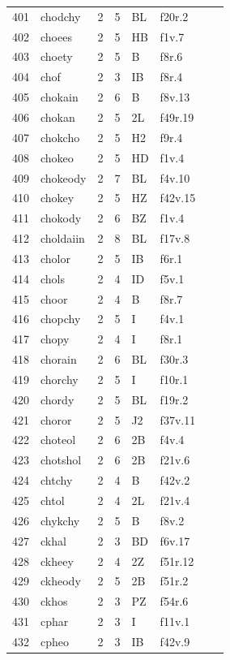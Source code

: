 \documentclass[11pt,a4paper]{article}
\begin{document}
\begin{landscape}
\begin{longtable}{@{}r>{\ttfamily}lrrl>{\ttfamily}l>{\raggedright\arraybackslash}p{80mm}>{\raggedright\arraybackslash}p{36mm}@{}}
401 & chodchy & 2 & 5 & BL & f20r.2 &  & \\
402 & choees & 2 & 5 & HB & f1v.7 &  & \\
403 & choety & 2 & 5 & B & f8r.6 &  & \\
404 & chof & 2 & 3 & IB & f8r.4 &  & \\
405 & chokain & 2 & 6 & B & f8v.13 &  & \\
406 & chokan & 2 & 5 & 2L & f49r.19 &  & \\
407 & chokcho & 2 & 5 & H2 & f9r.4 &  & \\
408 & chokeo & 2 & 5 & HD & f1v.4 &  & \\
409 & chokeody & 2 & 7 & BL & f4v.10 &  & \\
410 & chokey & 2 & 5 & HZ & f42v.15 &  & \\
411 & chokody & 2 & 6 & BZ & f1v.4 &  & \\
412 & choldaiin & 2 & 8 & BL & f17v.8 &  & \\
413 & cholor & 2 & 5 & IB & f6r.1 &  & \\
414 & chols & 2 & 4 & ID & f5v.1 &  & \\
415 & choor & 2 & 4 & B & f8r.7 &  & \\
416 & chopchy & 2 & 5 & I & f4v.1 &  & \\
417 & chopy & 2 & 4 & I & f8r.1 &  & \\
418 & chorain & 2 & 6 & BL & f30r.3 &  & \\
419 & chorchy & 2 & 5 & I & f10r.1 &  & \\
420 & chordy & 2 & 5 & BL & f19r.2 &  & \\
421 & choror & 2 & 5 & J2 & f37v.11 &  & \\
422 & choteol & 2 & 6 & 2B & f4v.4 &  & \\
423 & chotshol & 2 & 6 & 2B & f21v.6 &  & \\
424 & chtchy & 2 & 4 & B & f42v.2 &  & \\
425 & chtol & 2 & 4 & 2L & f21v.4 &  & \\
426 & chykchy & 2 & 5 & B & f8v.2 &  & \\
427 & ckhal & 2 & 3 & BD & f6v.17 &  & \\
428 & ckheey & 2 & 4 & 2Z & f51r.12 &  & \\
429 & ckheody & 2 & 5 & 2B & f51r.2 &  & \\
430 & ckhos & 2 & 3 & PZ & f54r.6 &  & \\
431 & cphar & 2 & 3 & I & f11v.1 &  & \\
432 & cpheo & 2 & 3 & IB & f42v.9 &  & \\

\end{longtable}
\end{landscape}
\end{document}
